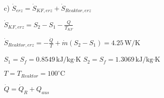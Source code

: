 c) \( \dot{S}_{erz} = \dot{S}_{KF,erz} + \dot{S}_{Reaktor,erz} \)  

\( \dot{S}_{KF,erz} = S_2 - S_1 - \frac{Q}{T_{KF}} \)  

\( \dot{S}_{Reaktor,erz} = -\frac{\dot{Q}}{T} + \dot{m} (S_2 - S_1) = 4.25 \, \text{W/K} \)  

\( S_1 = S_f = 0.8549 \, \text{kJ/kg·K} \)  
\( S_2 = S_f = 1.3069 \, \text{kJ/kg·K} \)  

\( T = T_{Reaktor} = 100^\circ \text{C} \)  

\( \dot{Q} = \dot{Q}_R + Q_{aus} \)